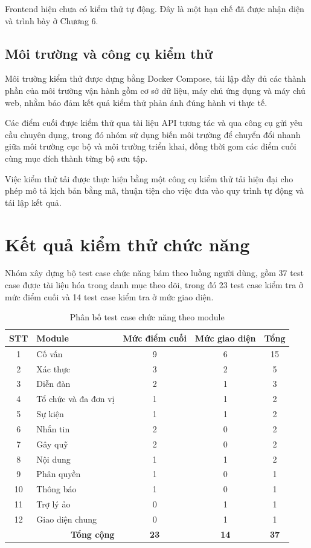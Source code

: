 \documentclass[12pt,a4paper,oneside]{report}
\begin{document}
Frontend hiện chưa có kiểm thử tự động. Đây là một hạn chế đã được nhận diện và trình bày ở Chương 6.

\subsection{Môi trường và công cụ kiểm thử}

Môi trường kiểm thử được dựng bằng Docker Compose, tái lập đầy đủ các thành phần của môi trường vận hành gồm cơ sở dữ liệu, máy chủ ứng dụng và máy chủ web, nhằm bảo đảm kết quả kiểm thử phản ánh đúng hành vi thực tế.

Các điểm cuối được kiểm thử qua tài liệu API tương tác và qua công cụ gửi yêu cầu chuyên dụng, trong đó nhóm sử dụng biến môi trường để chuyển đổi nhanh giữa môi trường cục bộ và môi trường triển khai, đồng thời gom các điểm cuối cùng mục đích thành từng bộ sưu tập.

Việc kiểm thử tải được thực hiện bằng một công cụ kiểm thử tải hiện đại cho phép mô tả kịch bản bằng mã, thuận tiện cho việc đưa vào quy trình tự động và tái lập kết quả.

\section{Kết quả kiểm thử chức năng}

Nhóm xây dựng bộ test case chức năng bám theo luồng người dùng, gồm 37 test case được tài liệu hóa trong danh mục theo dõi, trong đó 23 test case kiểm tra ở mức điểm cuối và 14 test case kiểm tra ở mức giao diện.

\renewcommand{\arraystretch}{1.25}
\begin{table}[H]
\centering
\small
\caption{Phân bố test case chức năng theo module}
\label{tab:testcases}
\begin{tabular}{|c|>{\raggedright\arraybackslash}p{5.6cm}|c|c|c|}
\hline
\textbf{STT} & \textbf{Module} & \textbf{Mức điểm cuối} & \textbf{Mức giao diện} & \textbf{Tổng} \\ \hline
1 & Cố vấn & 9 & 6 & 15 \\ \hline
2 & Xác thực & 3 & 2 & 5 \\ \hline
3 & Diễn đàn & 2 & 1 & 3 \\ \hline
4 & Tổ chức và đa đơn vị & 1 & 1 & 2 \\ \hline
5 & Sự kiện & 1 & 1 & 2 \\ \hline
6 & Nhắn tin & 2 & 0 & 2 \\ \hline
7 & Gây quỹ & 2 & 0 & 2 \\ \hline
8 & Nội dung & 1 & 1 & 2 \\ \hline
9 & Phân quyền & 1 & 0 & 1 \\ \hline
10 & Thông báo & 1 & 0 & 1 \\ \hline
11 & Trợ lý ảo & 0 & 1 & 1 \\ \hline
12 & Giao diện chung & 0 & 1 & 1 \\ \hline
\multicolumn{2}{|r|}{\textbf{Tổng cộng}} & \textbf{23} & \textbf{14} & \textbf{37} \\ \hline
\end{tabular}
\end{table}
\renewcommand{\arraystretch}{1}
\end{document}
